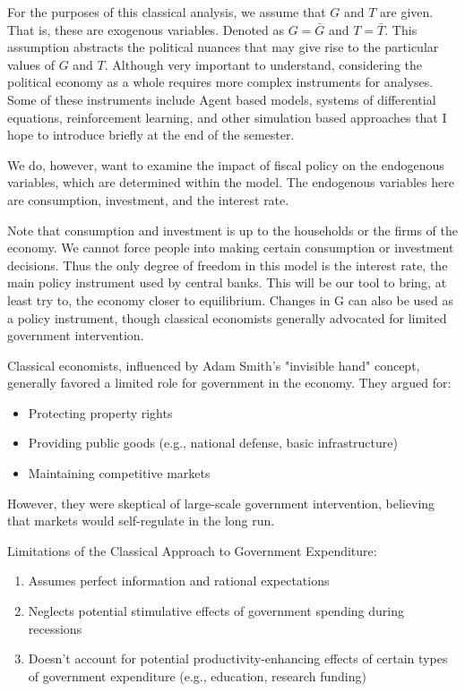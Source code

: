 \documentclass[10pt]{article}
\begin{document}
For the purposes of this classical analysis, we assume that $G$ and $T$ are given. That is, these are exogenous variables. Denoted as $G=\bar{G}$ and $T=\bar{T}$. This assumption abstracts the political nuances that may give rise to the particular values of $G$ and $T$. Although very important to understand, considering the political economy as a whole requires more complex instruments for analyses. Some of these instruments include Agent based models, systems of differential equations, reinforcement learning, and other simulation based approaches that I hope to introduce briefly at the end of the semester.

We do, however, want to examine the impact of fiscal policy on the endogenous variables, which are determined within the model. The endogenous variables here are consumption, investment, and the interest rate.

Note that consumption and investment is up to the households or the firms of the economy. We cannot force people into making certain consumption or investment decisions. Thus the only degree of freedom in this model is the interest rate, the main policy instrument used by central banks. This will be our tool to bring, at least try to, the economy closer to equilibrium. Changes in G can also be used as a policy instrument, though classical economists generally advocated for limited government intervention.

Classical economists, influenced by Adam Smith's "invisible hand" concept, generally favored a limited role for government in the economy. They argued for:

\begin{itemize}
  \item Protecting property rights
  \item Providing public goods (e.g., national defense, basic infrastructure)
  \item Maintaining competitive markets
\end{itemize}

However, they were skeptical of large-scale government intervention, believing that markets would self-regulate in the long run.

Limitations of the Classical Approach to Government Expenditure:

\begin{enumerate}
  \item Assumes perfect information and rational expectations
  \item Neglects potential stimulative effects of government spending during recessions
  \item Doesn't account for potential productivity-enhancing effects of certain types of government expenditure (e.g., education, research funding)
\end{enumerate}
\end{document}
